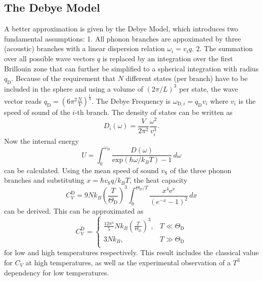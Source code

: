 \subsection{The Debye Model}
A better approximation is given by the Debye Model, which introduces two fundamental assumptions: 1. All phonon branches are appoximated by three (acoustic) branches with
a linear dispersion relation $\omega_i = v_i q$. 2. The summation over all possible wave vectors $q$ is replaced by an integration over the first Brillouin zone that can further
be simplified to a spherical integration with radius $q_\text{D}$. Because of the requirement that $N$ different states (per branch) have to be included in the sphere and using a
volume of $(2\pi/L)^3$ per state, the wave vector reads $q_\text{D} = \left(6\pi^2 \frac{N}{V}\right)^{\frac{1}{3}}$.
The Debye Frequency is $\omega_{\text{D}, i} = q_\text{D} v_i$ where $v_i$ is the speed of sound of the $i$-th branch.
The density of states can be written as
\begin{equation*}
    D_i(\omega) = \frac{V}{2\pi^2}\frac{\omega^2}{v^3_i}.
\end{equation*}
Now the internal energy
\begin{equation*}
    U = \int^{\omega_\text{D}}_{0} \frac{D(\omega)}{\mathrm{exp}(\hbar\omega / k_B T) -1} \,d\omega
\end{equation*}
can be calculated.
Using the mean speed of sound $v_\text{S}$ of the three phonon branches and substituting $x = \hbar v_\text{S} q /k_B T$, the heat capacity
\begin{equation}
    \label{eqn:CV_Debye}
    C^\text{D}_V = 9N k_B \left(\frac{T}{\Theta_\text{D}}\right)^3 \int^{\Theta_\text{D}/T}_{0} \frac{x^4 \mathrm{e}^x}{(e^{-x} -1)^2} \, dx
\end{equation}
can be derived.
This can be approximated as
\begin{equation*}
    C^\text{D}_V =
    \begin{cases}
        \frac{12\pi^4}{5}Nk_B \left(\frac{T}{\Theta_\text{D}}\right)^3, & T \ll \Theta_\text{D}\\
        3Nk_B, & T \gg \Theta_\text{D}\\
    \end{cases}
\end{equation*}
for low and high temperatures respectively. This result includes the classical value for $C_V$ at high temperatures, as well as the experimental observation of
a $T^3$ dependency for low temperatures.
